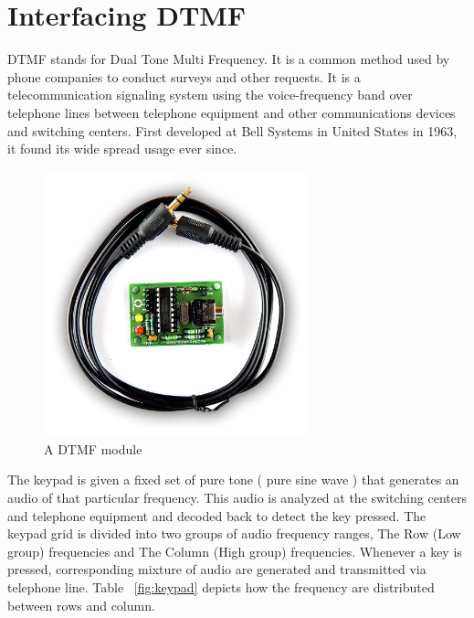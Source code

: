 \chapter{Interfacing DTMF}
\label{ch:dtmf}

\ac{DTMF} stands for Dual Tone Multi Frequency. It is a common method used by phone companies to conduct surveys and other requests. It is a telecommunication signaling system using the voice-frequency band over telephone lines between telephone equipment and other communications devices and switching centers. First developed at Bell Systems in United States in 1963, it found its wide spread usage ever since.


\begin{figure}
    \centering
    \includegraphics[width=3in]{Images/DTMF/DTMF_module.jpg}
    \caption[DTMF Module]{A \ac{DTMF} module }
\end{figure}

\par The keypad is given a fixed set of pure tone ( pure sine wave ) that generates an audio of that particular frequency. This audio is analyzed at the switching centers and telephone equipment and decoded back to detect the key pressed. The keypad grid is divided into two groups of audio frequency ranges, The Row (Low group) frequencies and The Column (High group) frequencies. Whenever a key is pressed, corresponding mixture of audio are generated and transmitted via telephone line. Table ~\ref{fig:keypad} depicts how the frequency are distributed between rows and column.

